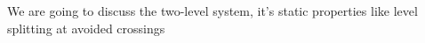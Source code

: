 We are going to discuss the two-level system, it's static properties like level splitting at avoided crossings 